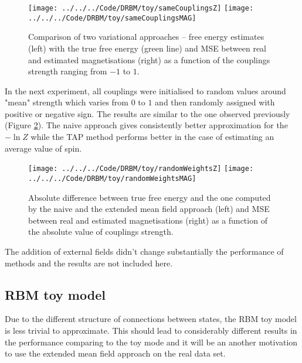 \begin{figure}[!htb]
%
\texttt{[image: ../../../Code/DRBM/toy/sameCouplingsZ]}
\endminipage 
{}  
\texttt{[image: ../../../Code/DRBM/toy/sameCouplingsMAG]}
\endminipage\hfill
  \caption[Grid toy model -- the couplings strength]{Comparison of two  variational approaches -- free energy estimates (left) with the true free energy (green line) and MSE between real and estimated magnetisations (right) as a function of the couplings strength ranging from $-1$ to $1$.}
  \label{fig:gridModel}
\end{figure}

In the next experiment, all couplings were initialised to random values around "mean" strength which varies from $0$ to $1$ and then randomly assigned with positive or negative sign. The results are similar to the one observed previously (Figure \ref{fig:gridModelCoup}). The naive approach gives consistently better approximation for the $-\ln Z$ while the TAP method performs better in the case of estimating an average value of spin. 

\begin{figure}[!htb]
%
\texttt{[image: ../../../Code/DRBM/toy/randomWeightsZ]}
\endminipage 
{}  
\texttt{[image: ../../../Code/DRBM/toy/randomWeightsMAG]}
\endminipage\hfill
  \caption[1]{Absolute difference between true free energy and the one computed by the naive and the extended mean field approach (left) and MSE between real and estimated magnetisations (right) as a function of the absolute value of couplings strength.}
  \label{fig:gridModelCoup}
\end{figure}

The addition of external fields didn't change substantially the performance of methods  and the results are not included here.

\subsection{RBM toy model}
Due to the different structure of connections between states, the RBM toy model is less trivial to approximate. This should lead to considerably different results in the performance comparing to the toy mode  and it will be an another motivation to use the extended mean field approach on the real data set.

